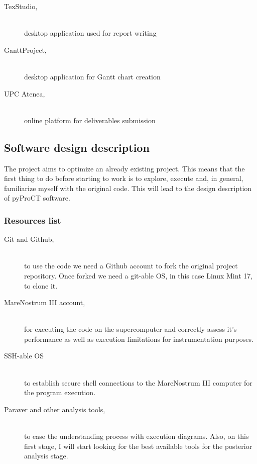 \begin{description}
\item [TexStudio,] \hfill \\ desktop application used for report writing
\item [GanttProject,] \hfill \\ desktop application for Gantt chart creation
\item [UPC Atenea,] \hfill \\ online platform for deliverables submission
\end{description}

\subsection{Software design description}

The project aims to optimize an already existing project. This means that the first thing to do before starting to work is to explore, execute and, in general, familiarize myself with the original code. This will lead to the design description of pyProCT software. 

\subsubsection{Resources list}
\label{subsec:familiarresources}

\begin{description}
\item [Git and Github,] \hfill \\ to use the code we need a Github account to fork the original project repository. Once forked we need a git-able OS, in this case Linux Mint 17, to clone it. 
\item [MareNostrum III account,] \hfill \\ for executing the code on the supercomputer and correctly assess it's performance as well as execution limitations for instrumentation purposes.
\item [SSH-able OS] \hfill \\ to establish secure shell connections to the MareNostrum III computer for the program execution.
\item [Paraver and other analysis tools,] \hfill \\ to ease the understanding process with execution diagrams. Also, on this first stage, I will start looking for the best available tools for the posterior analysis stage.

\end{description}

